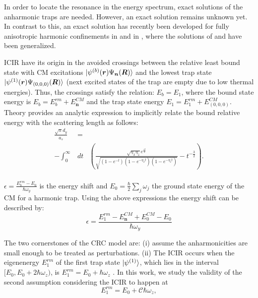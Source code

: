 \documentclass[aps,pre,twocolumn,superscriptaddress,showpacs]{revtex4-1}
\newcommand{\bfeq}[1]{{\boldsymbol{#1}}}
\begin{document}
In order to locate the resonance in the energy spectrum, exact solutions of the anharmonic traps are needed. However, an exact solution remains unknown yet. In contrast to this, an exact solution
has recently been developed for fully anisotropic harmonic confinements in \cite{PhysRevA.101.053624} and in \cite{PhysRevA.102.013314}, where the solutions of \cite{PhysRevA.74.022712} and
 \cite{Liang_2008} have been generalized. 
	
ICIR have its origin in the avoided crossings between the relative least bound state with CM excitations $\ket{\psi^{(b)}(\bfeq{r}) \Psi_{\bfeq{n}} (\bfeq{R})}$ and the lowest trap state
$\ket{\psi^{(1)}(\bfeq{r}) \Psi_{(0,0,0)} (\bfeq{R})}$ (next excited states of the trap are empty due to low thermal energies).  Thus, the crossings satisfy the relation: $E_b = E_1$, where the 
bound state energy is $E_b = E^{rm}_b + E^{CM}_{\bfeq{n}}$ and the trap state energy $E_1 = E^{rm}_1 + E^{CM}_{(0,0,0)}$. Theory provides an analytic expression to implicitly relate the
bound relative energy with the scattering length as follows:
\begin{eqnarray}
\frac{\sqrt{\pi} d_y}{a_s} &=& \nonumber \\
 - \int^\infty_0 &dt& \left( \frac{\sqrt{\eta_x \eta_z} e^{\frac{\epsilon t}{2}}}{\sqrt{(1 - e^{-t}) (1 - e^{-\eta_x t}) (1 - e^{-\eta_z t})} } - t^{-\frac{3}{2}}\right). \nonumber \\
\label{eq:ascE}
\end{eqnarray}
	
$\epsilon = \frac{E^{rm}_b - E_0}{\hbar \omega_y}$ is the energy shift and $E_0 = \frac{\hbar}{2}\sum_j \omega_j $ the ground state energy of the CM for a harmonic trap. Using the above
expressions the energy shift can be described by:
\begin{equation}
\epsilon = \frac{E^{rm}_1 - E^{CM}_{\bfeq{n}} + E^{CM}_0 - E_0}{\hbar \omega_y}
\label{eq:Energy shift}
\end{equation}
	
The two cornerstones of the CRC model are: (i) assume the anharmonicities are small enough to be treated as perturbations. (ii) The ICIR occurs when the eigenenergy $E^{rm}_1$
of the first trap state $\ket{\psi^{(1)}}$, which lies in the interval $[E_0, E_0 + 2\hbar \omega_z)$, is $E^{rm}_1 = E_0 + \hbar \omega_z$ \cite{PhysRevLett.109.073201}. In this work, we study 
the validity of the second assumption considering the ICIR to happen at
\begin{equation}
E^{rm}_1 = E_0 + \mathcal{C} \hbar \omega_z,
\label{eq:C equation}
\end{equation}
	
\end{document}
